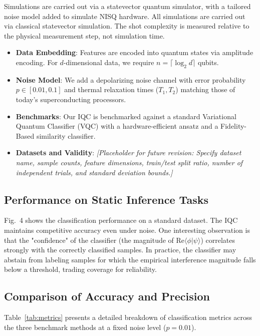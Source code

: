 \documentclass[conference]{IEEEtran}
\begin{document}
Simulations are carried out via a statevector quantum simulator, with a tailored noise model added to simulate NISQ hardware. All simulations are carried out via classical statevector simulation. The shot complexity is measured relative to the physical measurement step, not simulation time.
\begin{itemize}
    \item \textbf{Data Embedding}: Features are encoded into quantum states via amplitude encoding. For $d$-dimensional data, we require $n = \lceil \log_2 d \rceil$ qubits.
    \item \textbf{Noise Model}: We add a depolarizing noise channel with error probability $p \in [0.01, 0.1]$ and thermal relaxation times ($T_1, T_2$) matching those of today's superconducting processors.
    \item \textbf{Benchmarks}: Our IQC is benchmarked against a standard Variational Quantum Classifier (VQC) with a hardware-efficient ansatz and a Fidelity-Based similarity classifier.
    \item \textbf{Datasets and Validity}: \textit{[Placeholder for future revision: Specify dataset name, sample counts, feature dimensions, train/test split ratio, number of independent trials, and standard deviation bounds.]}
\end{itemize}

\subsection{Performance on Static Inference Tasks}

Fig.~4 shows the classification performance on a standard dataset. The IQC maintains competitive accuracy even under noise. One interesting observation is that the "confidence" of the classifier (the magnitude of $\text{Re}\langle \phi|\psi \rangle$) correlates strongly with the correctly classified samples. In practice, the classifier may abstain from labeling samples for which the empirical interference magnitude falls below a threshold, trading coverage for reliability.

\subsection{Comparison of Accuracy and Precision}

Table~\ref{tab:metrics} presents a detailed breakdown of classification metrics across the three benchmark methods at a fixed noise level ($p=0.01$).
\end{document}
